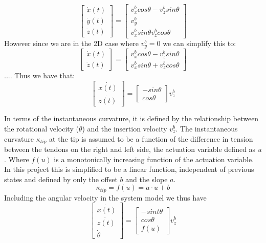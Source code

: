 \begin{equation}
    \begin{bmatrix}
        \dot{x}(t)\\ \dot{y}(t)\\ \dot{z}(t)
    \end{bmatrix} = \begin{bmatrix}
        v_x^bcos \theta - v_z^b sin \theta\\
        v_y^b\\
        v_x^b sin \theta  v_z^b cos \theta
    \end{bmatrix}
\end{equation}
However since we are in the 2D case where \(v_y^b = 0\) we can simplify this to:
\begin{equation}
        \begin{bmatrix}
        \dot{x}(t)\\ \dot{z}(t)
    \end{bmatrix} = \begin{bmatrix}
        v_x^bcos \theta - v_z^b sin \theta\\
        v_x^b sin \theta + v_z^b cos \theta
    \end{bmatrix}
\end{equation}
 .... Thus we have that:
\begin{equation}
	\begin{bmatrix}
	\dot{x(t)} \\ \dot{z(t)}
	\end{bmatrix} = \begin{bmatrix}
	-sin\theta \\ cos\theta
	\end{bmatrix} v_z^b
\end{equation}

\newline \newline
In terms of the instantaneous curvature, it is defined by the relationship between the rotational velocity ($\dot{\theta}$) and the insertion velocity $v_z^b$. The instantaneous curvature $\kappa_{tip}$ at the tip is assumed to be a function of the difference in tension between the tendons on the right and left side, the actuation variable defined as $u$. Where $f(u)$ is a monotonically increasing function of the actuation variable. In this project this is simplified to be a linear function, independent of previous states and defined by only the offset $b$ and the slope $a$. 
\begin{equation}
	\kappa_{tip} = f(u) = a\cdot u + b
\end{equation}
Including the angular velocity in the system model we thus have
\begin{equation}
	\begin{bmatrix}
		\dot{x(t)} \\ \dot{z(t)} \\ \dot{\theta}
	\end{bmatrix} = \begin{bmatrix}
	-sint\theta \\ cos\theta \\ f(u)
	\end{bmatrix}v_z^b
\end{equation}

